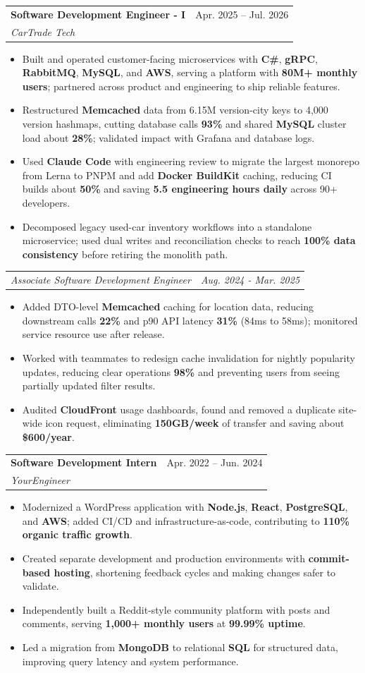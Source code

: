 \documentclass[letterpaper,11pt]{article}
\makeatletter
\newcommand{\resumeItem}[1]{
  \item\small{
    {#1 \vspace{-2pt}}
  }
}
\newcommand{\resumeSubheading}[4]{
  \vspace{-2pt}\item
    \begin{tabular*}{0.97\textwidth}[t]{l@{\extracolsep{\fill}}r}
      \textbf{#1} & #2 \\
      \textit{\small#3} & \textit{\small #4} \\
    \end{tabular*}\vspace{-7pt}
}
\newcommand{\resumeSubSubheading}[2]{
    \item
    \begin{tabular*}{0.97\textwidth}{l@{\extracolsep{\fill}}r}
      \textit{\small#1} & \textit{\small #2} \\
    \end{tabular*}\vspace{-7pt}
}
\newcommand{\resumeItemListStart}{\begin{itemize}}
\newcommand{\resumeItemListEnd}{\end{itemize}\vspace{-5pt}}
\makeatother
\begin{document}
\resumeSubheading
{Software Development Engineer - I}{Apr. 2025 -- Jul. 2026}
{CarTrade Tech}{ }
\resumeItemListStart
\resumeItem{Built and operated customer-facing microservices with \textbf{C\#}, \textbf{gRPC}, \textbf{RabbitMQ}, \textbf{MySQL}, and \textbf{AWS}, serving a platform with \textbf{80M+ monthly users}; partnered across product and engineering to ship reliable features.}
\resumeItem{Restructured \textbf{Memcached} data from 6.15M version-city keys to 4,000 version hashmaps, cutting database calls \textbf{93\%} and shared \textbf{MySQL} cluster load about \textbf{28\%}; validated impact with Grafana and database logs.}
\resumeItem{Used \textbf{Claude Code} with engineering review to migrate the largest monorepo from Lerna to PNPM and add \textbf{Docker BuildKit} caching, reducing CI builds about \textbf{50\%} and saving \textbf{5.5 engineering hours daily} across 90+ developers.}
\resumeItem{Decomposed legacy used-car inventory workflows into a standalone microservice; used dual writes and reconciliation checks to reach \textbf{100\% data consistency} before retiring the monolith path.}
\resumeItemListEnd
\resumeSubSubheading
{Associate Software Development Engineer}{Aug. 2024 - Mar. 2025}
\resumeItemListStart
\resumeItem{Added DTO-level \textbf{Memcached} caching for location data, reducing downstream calls \textbf{22\%} and p90 API latency \textbf{31\%} (84ms to 58ms); monitored service resource use after release.}
\resumeItem{Worked with teammates to redesign cache invalidation for nightly popularity updates, reducing clear operations \textbf{98\%} and preventing users from seeing partially updated filter results.}
\resumeItem{Audited \textbf{CloudFront} usage dashboards, found and removed a duplicate site-wide icon request, eliminating \textbf{150GB/week} of transfer and saving about \textbf{\$600/year}.}
\resumeItemListEnd

\resumeSubheading
{Software Development Intern}{Apr. 2022 -- Jun. 2024}
{YourEngineer}{ }
\resumeItemListStart
\resumeItem{Modernized a WordPress application with \textbf{Node.js}, \textbf{React}, \textbf{PostgreSQL}, and \textbf{AWS}; added CI/CD and infrastructure-as-code, contributing to \textbf{110\% organic traffic growth}.}
\resumeItem{Created separate development and production environments with \textbf{commit-based hosting}, shortening feedback cycles and making changes safer to validate.}
\resumeItem{Independently built a Reddit-style community platform with posts and comments, serving \textbf{1,000+ monthly users} at \textbf{99.99\% uptime}.}
\resumeItem{Led a migration from \textbf{MongoDB} to relational \textbf{SQL} for structured data, improving query latency and system performance.}
\resumeItemListEnd
\end{document}
